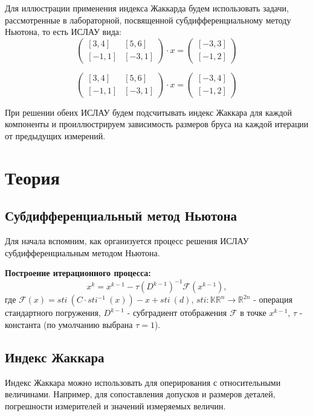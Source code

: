 \documentclass[12pt,a4paper]{article}
\begin{document}
Для иллюстрации применения индекса Жаккарда будем использовать задачи, рассмотренные в лабораторной, посвященной субдифференциальному методу Ньютона, то есть ИСЛАУ вида:
\begin{equation}
    \label{islau1}
    \begin{pmatrix}
        [3,4] & [5,6]\\
        [-1,1] & [-3,1]
    \end{pmatrix}
    \cdot{x}=
    \begin{pmatrix}
        [-3,3]\\
        [-1,2]
    \end{pmatrix}
\end{equation}

\begin{equation}
    \label{islau2}
    \begin{pmatrix}
        [3,4] & [5,6]\\
        [-1,1] & [-3,1]
    \end{pmatrix}
    \cdot{x}=
    \begin{pmatrix}
        [-3,4]\\
        [-1,2]
    \end{pmatrix}
\end{equation}

При решении обеих ИСЛАУ будем подсчитывать индекс Жаккара для каждой компоненты и проиллюстрируем зависимость размеров бруса на каждой итерации от предыдущих измерений.

\section{Теория}
\subsection{Субдифференциальный метод Ньютона}
Для начала вспомним, как организуется процесс решения ИСЛАУ субдифференциальным методом Ньютона.

\textbf{Построение итерационного процесса:}
\begin{equation}
    x^k=x^{k-1}-\tau(D^{k-1})^{-1}\mathcal{F}(x^{k-1}),
\end{equation}
где $\mathcal{F}(x)=sti\:(C\cdot{sti}^{-1}\:(x))-x+sti\:(d)$, $sti:\mathbb{KR}^n\rightarrow\mathbb{R}^{2n}$ - операция стандартного погружения, $D^{k-1}$ - субградиент отображения $\mathcal{F}$ в точке $x^{k-1}$, $\tau$ - константа (по умолчанию выбрана $\tau=1$).

\subsection{Индекс Жаккара}
Индекс Жаккара можно использовать для оперирования с относительными величинами. Например, для сопоставления допусков и размеров деталей, погрешности измерителей и значений измеряемых величин.
\end{document}
